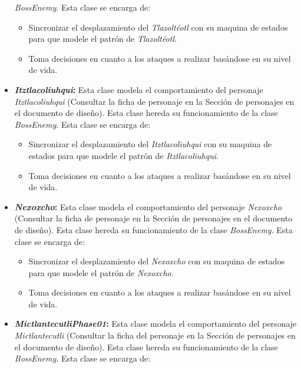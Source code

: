 \begin{itemize}
			\textit{BossEnemy}. Esta clase se encarga de:  
			\begin{itemize}
				\item Sincronizar el desplazamiento del \textit{Tlazoltéotl} con su maquina 
				de estados para que modele el patrón de \textit{Tlazoltéotl}.
				\item Toma decisiones en cuanto a los ataques a realizar basándose en su 
				nivel de vida.
			\end{itemize}
			\item \textbf{\textit{Itztlacoliuhqui}:} Esta clase modela el comportamiento del personaje 
			\textit{Itztlacoliuhqui} (Consultar la ficha de personaje en la Sección de personajes en 
			el documento de diseño). Esta clase hereda su funcionamiento de la clase 
			\textit{BossEnemy}. Esta clase se encarga de:  
			\begin{itemize}
				\item Sincronizar el desplazamiento del \textit{Itztlacoliuhqui} con su maquina 
				de estados para que modele el patrón de \textit{Itztlacoliuhqui}.
				\item Toma decisiones en cuanto a los ataques a realizar basándose en su 
				nivel de vida.
			\end{itemize}
			\item \textbf{\textit{Nexoxcho}:} Esta clase modela el comportamiento del personaje 
			\textit{Nexoxcho} (Consultar la ficha de personaje en la Sección de personajes en 
			el documento de diseño). Esta clase hereda su funcionamiento de la clase 
			\textit{BossEnemy}. Esta clase se encarga de:  
			\begin{itemize}
				\item Sincronizar el desplazamiento del \textit{Nexoxcho} con su maquina 
				de estados para que modele el patrón de \textit{Nexoxcho}.
				\item Toma decisiones en cuanto a los ataques a realizar basándose en su 
				nivel de vida.
			\end{itemize}
			\item \textbf{\textit{MictlantecutliPhase01}:} Esta clase modela el 
			comportamiento del personaje \textit{Mictlantecutli} (Consultar la ficha 
			del personaje en la Sección de personajes en 
			el documento de diseño). Esta clase hereda su funcionamiento de la clase 
			\textit{BossEnemy}. Esta clase se encarga de:  
			\begin{itemize}

\end{itemize}
\end{itemize}
